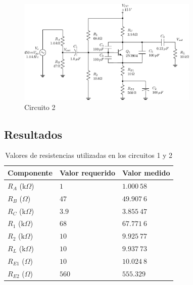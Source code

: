 \documentclass[journal]{IEEEtran}
\begin{document}
\begin{figure}[H]
        \centering
        \includegraphics[width=3.4in]{CIRCUITO2.pdf}
        \caption{Circuito 2}
        \label{fig:SignalExperimental_044}
\end{figure}

\vspace{1cm}


\subsection{Resultados}


\begin{table}[H]
        \centering
        \renewcommand{\arraystretch}{1.5}
        \caption{Valores de resistencias utilizadas en los circuitos 1 y 2}
        \begin{tabular}{ >{\centering\arraybackslash}m{2.5cm} >{\centering\arraybackslash}m{2.5cm} >{\centering\arraybackslash}m{2.5cm} }
                \hline
            \centering
            Componente & Valor requerido & Valor medido\\ 
            \hline
            \centering
            $R_A$ ($\mathrm{k}\Omega$) & $1$  & $1.000~58$  \\ 
            $R_B$ ($\Omega$) & $47$  & $49.907~6$  \\
            $R_C$ ($\mathrm{k}\Omega$) & $3.9$  & $3.855~47$  \\
            $R_1$ ($\mathrm{k}\Omega$) & $68$  & $67.771~6$ \\
            $R_2$ ($\mathrm{k}\Omega$) & $10$  & $9.925~77$ \\
            $R_L$ ($\mathrm{k}\Omega$) & $10$  & $9.937~73$ \\
            $R_{E1}$ ($\Omega$) & $10$  & $10.024~8$ \\
            $R_{E2}$ ($\Omega$) & $560$  & $555.329$ \\
            \hline
        \end{tabular}
        \label{tabla1}
    \end{table}
    
\end{document}
